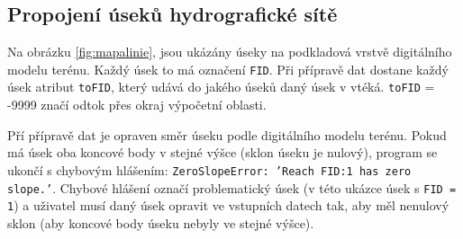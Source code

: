 \subsection{Propojení úseků hydrografické sítě} \label{sec:tokyodtok2}


Na obrázku \ref{fig:mapalinie}, jsou ukázány úseky na podkladová vrstvě digitálního modelu terénu. Každý úsek to má označení {\tt FID}. Při přípravě dat dostane každý úsek atribut {\tt toFID}, který udává do jakého úseků daný úsek v vtéká. {\tt toFID} = -9999 značí odtok přes okraj výpočetní oblasti. 



Pří přípravě dat je opraven směr úseku podle digitálního modelu terénu. Pokud má úsek oba koncové body v stejné výšce (sklon úseku je nulový), program se ukončí s chybovým hlášením: {\tt ZeroSlopeError: 'Reach FID:1 has zero slope.'}. Chybové hlášení označí problematický úsek (v této ukázce úsek s {\tt  FID = 1}) a uživatel musí daný úsek opravit ve vstupních datech tak, aby měl nenulový sklon (aby koncové body úseku nebyly ve stejné výšce).  













